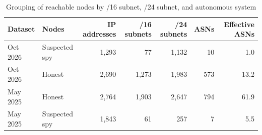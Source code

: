 \begin{table}[t]
\caption{
{\fontsize{20}{25}\selectfont  Grouping of reachable nodes by /16 subnet, /24 subnet, and autonomous system}
} 
\begin{tabular*}{\linewidth}{@{\extracolsep{\fill}}llrrrrr}
\toprule
Dataset & Nodes & IP addresses & /16 subnets & /24 subnets & ASNs & Effective ASNs \\ 
\midrule\addlinespace[2.5pt]
Oct 2026 & Suspected spy & 1,293 & 77 & 1,132 & 10 & 1.0 \\ 
Oct 2026 & Honest & 2,690 & 1,273 & 1,983 & 573 & 13.2 \\ 
May 2025 & Honest & 2,764 & 1,903 & 2,647 & 794 & 61.9 \\ 
May 2025 & Suspected spy & 1,843 & 61 & 257 & 7 & 5.5 \\ 
\bottomrule
\end{tabular*}
\label{table-concentration}
\end{table}
